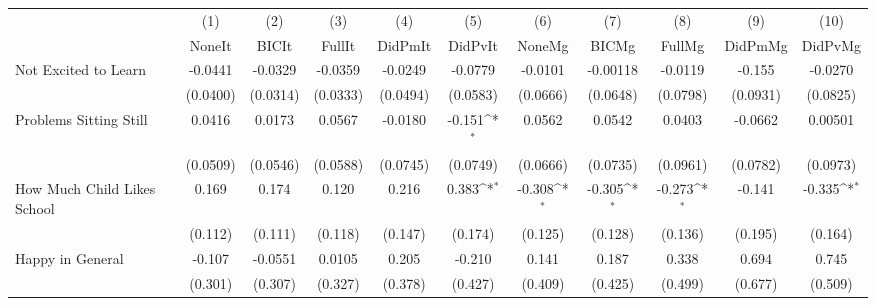 {
\def\sym#1{\ifmmode^{#1}\else\(^{#1}\)\fi}
\begin{tabular}{l*{10}{c}}
\toprule
            &\multicolumn{1}{c}{(1)}&\multicolumn{1}{c}{(2)}&\multicolumn{1}{c}{(3)}&\multicolumn{1}{c}{(4)}&\multicolumn{1}{c}{(5)}&\multicolumn{1}{c}{(6)}&\multicolumn{1}{c}{(7)}&\multicolumn{1}{c}{(8)}&\multicolumn{1}{c}{(9)}&\multicolumn{1}{c}{(10)}\\
            &\multicolumn{1}{c}{NoneIt}&\multicolumn{1}{c}{BICIt}&\multicolumn{1}{c}{FullIt}&\multicolumn{1}{c}{DidPmIt}&\multicolumn{1}{c}{DidPvIt}&\multicolumn{1}{c}{NoneMg}&\multicolumn{1}{c}{BICMg}&\multicolumn{1}{c}{FullMg}&\multicolumn{1}{c}{DidPmMg}&\multicolumn{1}{c}{DidPvMg}\\
\midrule
Not Excited to Learn&     -0.0441         &     -0.0329         &     -0.0359         &     -0.0249         &     -0.0779         &     -0.0101         &    -0.00118         &     -0.0119         &      -0.155         &     -0.0270         \\
            &    (0.0400)         &    (0.0314)         &    (0.0333)         &    (0.0494)         &    (0.0583)         &    (0.0666)         &    (0.0648)         &    (0.0798)         &    (0.0931)         &    (0.0825)         \\
\addlinespace
Problems Sitting Still&      0.0416         &      0.0173         &      0.0567         &     -0.0180         &      -0.151\sym{*}  &      0.0562         &      0.0542         &      0.0403         &     -0.0662         &     0.00501         \\
            &    (0.0509)         &    (0.0546)         &    (0.0588)         &    (0.0745)         &    (0.0749)         &    (0.0666)         &    (0.0735)         &    (0.0961)         &    (0.0782)         &    (0.0973)         \\
\addlinespace
How Much Child Likes School&       0.169         &       0.174         &       0.120         &       0.216         &       0.383\sym{*}  &      -0.308\sym{*}  &      -0.305\sym{*}  &      -0.273\sym{*}  &      -0.141         &      -0.335\sym{*}  \\
            &     (0.112)         &     (0.111)         &     (0.118)         &     (0.147)         &     (0.174)         &     (0.125)         &     (0.128)         &     (0.136)         &     (0.195)         &     (0.164)         \\
\addlinespace
Happy in General&      -0.107         &     -0.0551         &      0.0105         &       0.205         &      -0.210         &       0.141         &       0.187         &       0.338         &       0.694         &       0.745         \\
            &     (0.301)         &     (0.307)         &     (0.327)         &     (0.378)         &     (0.427)         &     (0.409)         &     (0.425)         &     (0.499)         &     (0.677)         &     (0.509)         \\
\bottomrule
\end{tabular}
}

